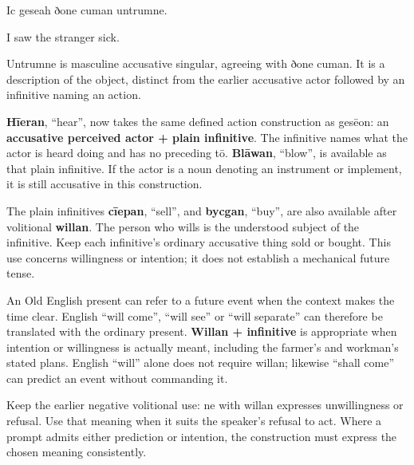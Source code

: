 Ic geseah ðone cuman untrumne.

I saw the stranger sick.

Untrumne is masculine accusative singular, agreeing with ðone cuman. It is a description of the object, distinct from the earlier accusative actor followed by an infinitive naming an action.

\textbf{Hīeran}, “hear”, now takes the same defined action construction as gesēon: an \textbf{accusative perceived actor + plain infinitive}. The infinitive names what the actor is heard doing and has no preceding tō. \textbf{Blāwan}, “blow”, is available as that plain infinitive. If the actor is a noun denoting an instrument or implement, it is still accusative in this construction.

The plain infinitives \textbf{cīepan}, “sell”, and \textbf{bycgan}, “buy”, are also available after volitional \textbf{willan}. The person who wills is the understood subject of the infinitive. Keep each infinitive's ordinary accusative thing sold or bought. This use concerns willingness or intention; it does not establish a mechanical future tense.

An Old English present can refer to a future event when the context makes the time clear. English “will come”, “will see” or “will separate” can therefore be translated with the ordinary present. \textbf{Willan + infinitive} is appropriate when intention or willingness is actually meant, including the farmer's and workman's stated plans. English “will” alone does not require willan; likewise “shall come” can predict an event without commanding it.

Keep the earlier negative volitional use: ne with willan expresses unwillingness or refusal. Use that meaning when it suits the speaker's refusal to act. Where a prompt admits either prediction or intention, the construction must express the chosen meaning consistently.

